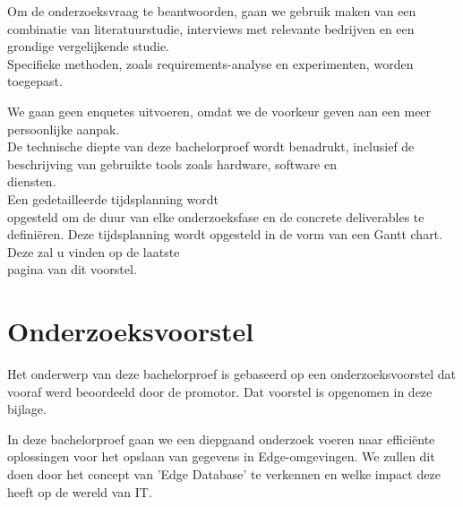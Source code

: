 \documentclass[dutch,dit,thesis]{hogentreport}
\begin{document}





%
%

Om de onderzoeksvraag te beantwoorden, gaan we gebruik maken van een combinatie van literatuurstudie,
 interviews met relevante bedrijven en een grondige vergelijkende studie. \\
 
Specifieke methoden, zoals requirements-analyse en experimenten, worden toegepast.

We gaan geen enquetes uitvoeren, omdat we de voorkeur geven aan een meer persoonlijke aanpak. \\
 
De technische diepte van deze bachelorproef wordt benadrukt,
 inclusief de beschrijving van gebruikte tools zoals hardware, software en \\ diensten. \\

Een gedetailleerde tijdsplanning wordt \\ opgesteld om de duur van elke onderzoeksfase en de concrete deliverables te definiëren.
Deze tijdsplanning wordt opgesteld in de vorm van een Gantt chart. Deze zal u vinden op de laatste \\ pagina van dit voorstel.





\appendix

\chapter{Onderzoeksvoorstel}

Het onderwerp van deze bachelorproef is gebaseerd op een onderzoeksvoorstel dat vooraf werd beoordeeld door de promotor. Dat voorstel is opgenomen in deze bijlage.


In deze bachelorproef gaan we een diepgaand onderzoek voeren naar efficiënte oplossingen voor het opslaan 
 van gegevens in Edge-omgevingen.
  We zullen dit doen door het concept van 'Edge Database' te verkennen
  en welke impact deze heeft op de wereld van IT.
\end{document}
